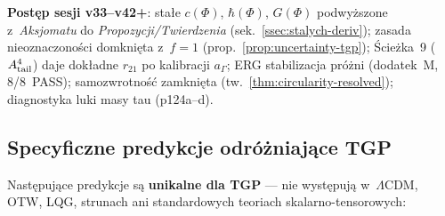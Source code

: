 \begin{remark}
\medskip\noindent
\textbf{Post\k{e}p sesji v33--v42+}:
sta\l{}e $c(\Phi)$, $\hbar(\Phi)$, $G(\Phi)$ podwy\.zszone
z~\textit{Aksjomatu} do \textit{Propozycji/Twierdzenia}
(sek.~\ref{ssec:stalych-deriv}); zasada nieoznaczono\'sci
domkni\k{e}ta z~$f = 1$ (prop.~\ref{prop:uncertainty-tgp});
\'Scie\.zka~9 ($A_{\rm tail}^4$) daje dok\l{}adne
$r_{21}$ po kalibracji $a_\Gamma$;
ERG stabilizacja pr\'o\.zni (dodatek~M, 8/8~PASS);
samozwrotno\'s\'c zamkni\k{e}ta (tw.~\ref{thm:circularity-resolved});
diagnostyka luki masy tau (p124a--d).
\end{remark}

\subsection{Specyficzne predykcje odr\'o\.zniaj\k{a}ce TGP}\label{ssec:specyficzne}

Nast\k{e}puj\k{a}ce predykcje s\k{a} \textbf{unikalne dla TGP}
--- nie wyst\k{e}puj\k{a} w~$\Lambda$CDM, OTW, LQG, strunach
ani standardowych teoriach skalarno-tensorowych:

